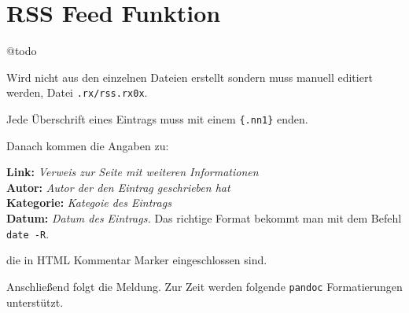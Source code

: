 \documentclass[%
fontsize=12pt,%
parskip=half,%
version=last%
]{scrreprt}
\begin{document}

\section{RSS Feed Funktion}\label{rss-feed-funktion}

@todo

Wird nicht aus den einzelnen Dateien erstellt sondern muss manuell
editiert werden, Datei \texttt{.rx/rss.rx0x}.

Jede Überschrift eines Eintrags muss mit einem \texttt{\{.nn1\}} enden.

Danach kommen die Angaben zu:

\textbf{Link:} \emph{Verweis zur Seite mit weiteren
Informationen}\\\textbf{Autor:} \emph{Autor der den Eintrag geschrieben
hat}\\\textbf{Kategorie:} \emph{Kategoie des Eintrags}\\\textbf{Datum:}
\emph{Datum des Eintrags.} Das richtige Format bekommt man mit dem
Befehl \texttt{date -R}.

die in HTML Kommentar Marker eingeschlossen sind.

Anschließend folgt die Meldung. Zur Zeit werden folgende \texttt{pandoc}
Formatierungen unterstützt.
\end{document}
